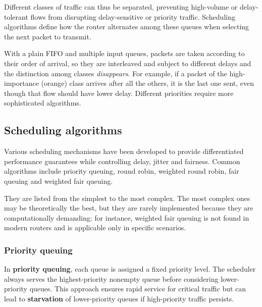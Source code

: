 \begin{center}
\end{center}

Different classes of traffic can thus be separated, preventing high-volume or delay-tolerant flows from disrupting delay-sensitive or priority traffic. Scheduling algorithms define how the router alternates among these queues when selecting the next packet to transmit.

With a plain FIFO and multiple input queues, packets are taken according to their order of arrival, so they are interleaved and subject to different delays and the distinction among classes \emph{disappears}. For example, if a packet of the high-importance (orange) class arrives after all the others, it is the last one sent, even though that flow should have lower delay. Different priorities require more sophisticated algorithms.

\subsection{Scheduling algorithms}

Various scheduling mechanisms have been developed to provide differentiated performance guarantees while controlling delay, jitter and fairness. Common algorithms include priority queuing, round robin, weighted round robin, fair queuing and weighted fair queuing.

They are listed from the simplest to the most complex. The most complex ones may be theoretically the best, but they are rarely implemented because they are computationally demanding: for instance, weighted fair queuing is not found in modern routers and is applicable only in specific scenarios.

\subsubsection*{Priority queuing}

In \textbf{priority queuing}, each queue is assigned a fixed priority level. The scheduler always serves the highest-priority nonempty queue before considering lower-priority queues. This approach ensures rapid service for critical traffic but can lead to \textbf{starvation} of lower-priority queues if high-priority traffic persists.


\begin{center}
\end{center}


